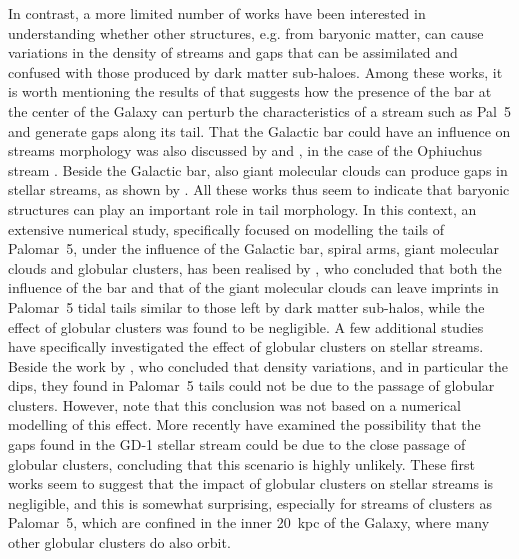 \documentclass{aa}
\begin{document}
  In contrast, a more limited number of works have been interested in understanding whether other structures, e.g. from baryonic matter, can cause variations in the density of streams and gaps that can be assimilated and confused with those produced by dark matter sub-haloes.  Among these works, it is worth mentioning the results of \citet{2017NatAs...1..633P} that suggests how the presence of the bar at the center of the Galaxy can perturb the characteristics of a stream such as Pal~5 and generate gaps along its tail. That the Galactic bar could have an influence on streams morphology was also discussed by \citet{2016MNRAS.460..497H} and \citet{2016ApJ...824..104P}, in the case of the Ophiuchus stream \citep{2014MNRAS.443L..84B}. Beside the Galactic bar, also giant molecular clouds can produce gaps in stellar streams, as shown by \citet{2016MNRAS.463L..17A}. All these works thus seem to indicate that baryonic structures can play an important role in tail morphology. In this context,  an extensive numerical study, specifically focused on modelling the tails of Palomar~5, under the influence of the Galactic bar, spiral arms, giant molecular clouds and globular clusters, has been realised by \citet{2019MNRAS.484.2009B}, who concluded that both the influence of the bar and that of the giant molecular clouds can leave imprints in Palomar~5 tidal tails similar to those left by dark matter sub-halos, while the effect of globular clusters was found to be negligible.  A few additional studies have specifically investigated the effect of globular clusters on stellar streams.  Beside the work by \citet{2017MNRAS.470...60E}, who concluded that density variations, and in particular the dips, they found in Palomar~5 tails could not be due to the passage of globular clusters. However, note that this conclusion was not based on a numerical modelling of this effect. More recently \citet{2022ApJ...941..129D} have examined the possibility that the gaps found in the GD-1 stellar stream could be due to the close passage of globular clusters, concluding that this scenario is highly unlikely. These first works seem to suggest that the impact of globular clusters on stellar streams is negligible, and this is somewhat surprising, especially for streams of clusters as Palomar~5, which are confined in the inner 20~kpc of the Galaxy, where many other globular clusters do also orbit. 
  
\end{document}
